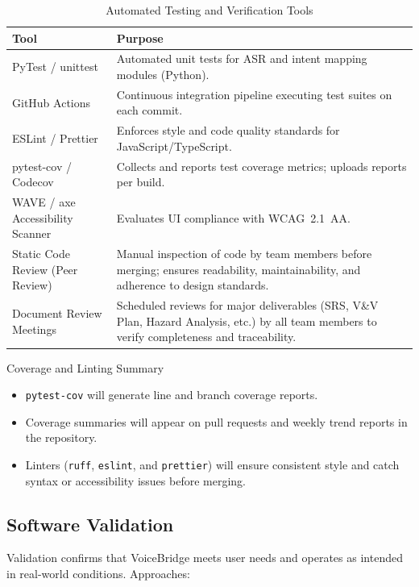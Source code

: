\documentclass[12pt, titlepage]{article}
\begin{document}
\begin{table}[H]
\centering
\caption{Automated Testing and Verification Tools}
\renewcommand{\arraystretch}{1.2}
\begin{tabular}{|p{4cm}|p{10cm}|}
\hline
Tool & Purpose \\ \hline
PyTest / unittest & Automated unit tests for ASR and intent mapping modules (Python). \\ \hline
GitHub Actions & Continuous integration pipeline executing test suites on each commit. \\ \hline
ESLint / Prettier & Enforces style and code quality standards for JavaScript/TypeScript. \\ \hline
pytest-cov / Codecov & Collects and reports test coverage metrics; uploads reports per build. \\ \hline
WAVE / axe Accessibility Scanner & Evaluates UI compliance with WCAG~2.1~AA. \\ \hline
Static Code Review (Peer Review) & Manual inspection of code by team members before merging; ensures readability, maintainability, and adherence to design standards. \\ \hline 
Document Review Meetings & Scheduled reviews for major deliverables (SRS, V\&V Plan, Hazard Analysis, etc.) by all team members to verify completeness and traceability. \\ \hline 
\end{tabular}
\end{table}

Coverage and Linting Summary

\begin{itemize}
    \item \texttt{pytest-cov} will generate line and branch coverage reports.
    \item Coverage summaries will appear on pull requests and weekly trend reports in the repository.
    \item Linters (\texttt{ruff}, \texttt{eslint}, and \texttt{prettier}) will ensure consistent style and catch syntax or accessibility issues before merging.
\end{itemize}

\subsection{Software Validation}

Validation confirms that VoiceBridge meets user needs and operates as intended in real-world conditions. Approaches:
\end{document}
